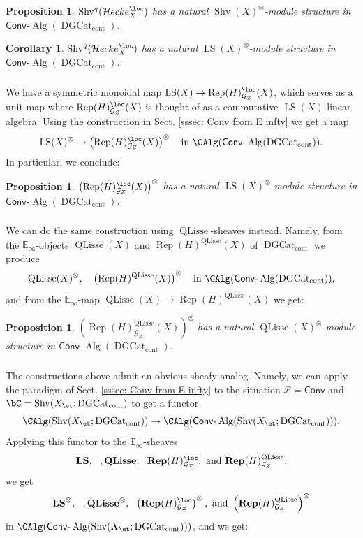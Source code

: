 \documentclass[10pt]{amsart}
\newcommand{\sssec}{\subsubsection}
\newtheorem{prop}[subsubsection]{Proposition}
\newtheorem{cor}[subsubsection]{Corollary}
\theoremstyle{remark}
\newcommand{\te}{\text}
\newcommand{\E}{\mathbb{E}}
\newcommand{\cP}{\mathcal{P}}
\newcommand{\on}{\operatorname}
\newcommand{\cG}{\mathcal{G}}
\newcommand{\DGcat}{\on{DGCat}_{\on{cont}}}
\newcommand{\lAlg}{\text{-}\on{Alg}}
\newcommand{\Rep}{\on{Rep}}
\newcommand{\Shv}{\on{Shv}}
\newcommand{\LS}{\on{LS}}
\newcommand{\QLisse}{\on{QLisse}}
\newcommand{\Conv}{\mathsf{Conv}}
\newcommand{\cHecke}{\mathcal{H}ecke}
\begin{document}
\begin{prop}
    $\Shv^q(\cHecke^{\loc}_X)$ has a natural $\Shv(X)^{\otimes}$-module structure in $\Conv\lAlg(\DGcat)$.
\end{prop}

\begin{cor}\label{cor: A side as a LS module in Conv}
    $\Shv^q(\cHecke^{\loc}_X)$ has a natural $\LS(X)^{\otimes}$-module structure in $\Conv\lAlg(\DGcat)$.
\end{cor}

\sssec{}\label{sssec: map from LS to Rep H loc}
 We have a symmetric monoidal map $\LS(X)\rightarrow \Rep(H)^{\loc}_{\cG_Z}(X)$, which serves as a unit map where $\Rep(H)^{\loc}_{\cG_Z}(X)$ is thought of as a commutative $\LS(X)$-linear algebra. Using the construction in Sect. \ref{sssec: Conv from E infty} we get a map
 \begin{equation}\label{eq: LS to twRepH}
\LS(X)^{\otimes}\rightarrow \left(\Rep(H)^{\loc}_{\cG_Z}(X)\right)^{\otimes}\quad \te{in } \CAlg(\Conv\lAlg(\DGcat)).
 \end{equation}
In particular, we conclude:

\begin{prop}\label{prop: B side as a LS module in Conv}
    $\left(\Rep(H)^{\loc}_{\cG_Z}(X)\right)^{\otimes}$ has a natural $\LS(X)^{\otimes}$-module structure in $\Conv\lAlg(\DGcat)$.
\end{prop}

\sssec{}
We can do the same construction using $\QLisse$-sheaves instead. Namely, from the $\E_{\infty}$-objects $\QLisse(X)$ and $\Rep(H)^{\QLisse}(X)$ of $\DGcat$ we produce
\[\QLisse(X)^{\otimes},\quad \left(\Rep(H)^{\QLisse}(X)\right)^{\otimes}\quad\te{in } \CAlg(\Conv\lAlg(\DGcat)),\]
and from the $\E_{\infty}$-map 
$\QLisse(X)\rightarrow \Rep(H)^{\QLisse}(X)$
we get:

\begin{prop}\label{prop: B QLisse as a QLisse module in Conv}
    $\left(\Rep(H)^{\QLisse}_{\cG_Z}(X)\right)^{\otimes}$ has a natural $\QLisse(X)^{\otimes}$-module structure in $\Conv\lAlg(\DGcat)$.
\end{prop}

\sssec{}\label{sssec: CAlg Conv algebras}
The constructions above admit an obvious sheafy analog. Namely, we can apply the paradigm of Sect. \ref{sssec: Conv from E infty} to the situation $\cP=\Conv$ and $\bC=\Shv(X_{\et};\DGcat)$ to get a functor
\[\CAlg(\Shv(X_{\et};\DGcat))\rightarrow \CAlg(\Conv\lAlg(\Shv(X_{\et};\DGcat))).\]
Applying this functor to the $\E_{\infty}$-sheaves
\[\textbf{LS}, \ \ , \textbf{QLisse}, \ \ \textbf{Rep}(H)^{\loc}_{\cG_Z},\ \te{and} \ \textbf{Rep}(H)^{\QLisse}_{\cG_Z},\]
we get
\[\textbf{LS}^{\otimes}, \ \ , \textbf{QLisse}^{\otimes}, \ \ \left(\textbf{Rep}(H)^{\loc}_{\cG_Z}\right)^{\otimes },\ \te{and} \ \left(\textbf{Rep}(H)^{\QLisse}_{\cG_Z}\right)^{\otimes}\]
in $\CAlg(\Conv\lAlg(\Shv(X_{\et};\DGcat)))$, and we get:
\end{document}

